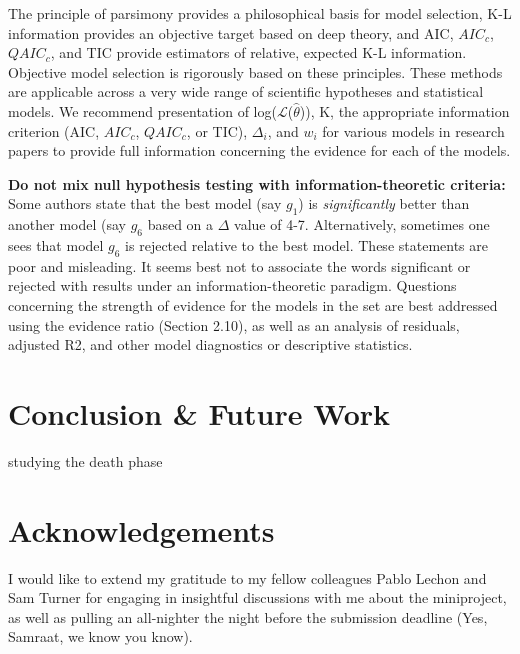 \documentclass[11pt]{article}
\begin{document}
\begin{linenumbers}
	\par The principle of parsimony provides a philosophical basis for model selection, K-L information provides an objective target based on deep theory, and AIC, $AIC_c$, $QAIC_c$, and TIC provide estimators of relative, expected K-L information. Objective model selection is rigorously based on these principles. These methods are applicable across a very wide range of scientific hypotheses and statistical models. We recommend presentation of log($\mathcal{L}$($\hat\theta$)), K, the appropriate information criterion (AIC, $AIC_c$, $QAIC_c$, or TIC), $\Delta_i$, and $w_i$ for various models in research papers to provide full information concerning the evidence for each of the models.\\

	\par \textbf{Do not mix null hypothesis testing with information-theoretic criteria:}\\
	Some authors state that the best model (say $g_1$) is \emph{significantly} better than another model (say $g_6$ based on a $\Delta$ value of 4-7. Alternatively, sometimes one sees that model $g_6$ is rejected relative to the best model. These statements are poor and misleading. It seems best not to associate the words significant or rejected with results under an information-theoretic paradigm. Questions concerning the strength of evidence for the models in the set are best addressed using the evidence ratio (Section 2.10), as well as an analysis of residuals, adjusted R2, and other model diagnostics or descriptive statistics.

	\section{Conclusion \& Future Work}
	studying the death phase %
	
	\section{Acknowledgements}
	I would like to extend my gratitude to my fellow colleagues Pablo Lechon and Sam Turner for engaging in insightful discussions with me about the miniproject, as well as pulling an all-nighter the night before the submission deadline (Yes, Samraat, we know you know).
	
	\end{linenumbers}

	
    
\end{document}
